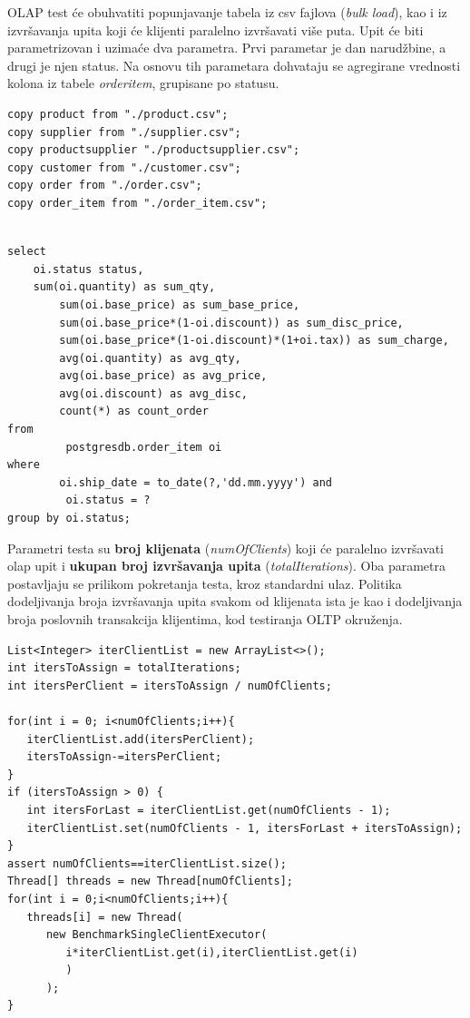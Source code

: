\documentclass[12pt,oneside]{memoir}
\begin{document}
OLAP test će obuhvatiti popunjavanje tabela iz csv fajlova (\textit{bulk load}), kao i iz izvršavanja upita koji će klijenti paralelno izvršavati više puta. Upit će biti parametrizovan i uzimaće dva parametra. Prvi parametar je dan narudžbine, a drugi je njen status. Na osnovu tih parametara dohvataju se agregirane vrednosti kolona iz tabele \textit{orderitem}, grupisane po statusu. 

\begin{lstlisting}[title={bulkLoad - Popunjavanje tabela iz csv fajlova},captionpos=b]
copy product from "./product.csv";
copy supplier from "./supplier.csv";
copy productsupplier "./productsupplier.csv";
copy customer from "./customer.csv";
copy order from "./order.csv";
copy order_item from "./order_item.csv";
\end{lstlisting}

\begin{lstlisting}[title={executeOLAPQuery - OLAP upit},captionpos=b]

select
	oi.status status,
	sum(oi.quantity) as sum_qty,
        sum(oi.base_price) as sum_base_price,
        sum(oi.base_price*(1-oi.discount)) as sum_disc_price,
        sum(oi.base_price*(1-oi.discount)*(1+oi.tax)) as sum_charge,
        avg(oi.quantity) as avg_qty,
        avg(oi.base_price) as avg_price,
        avg(oi.discount) as avg_disc,
        count(*) as count_order
from
         postgresdb.order_item oi
where
        oi.ship_date = to_date(?,'dd.mm.yyyy') and
         oi.status = ?
group by oi.status;
\end{lstlisting}


Parametri testa su \textbf{broj klijenata} (\textit{numOfClients}) koji će paralelno izvršavati olap upit i \textbf{ukupan broj izvršavanja upita} (\textit{totalIterations}). Oba parametra postavljaju se prilikom pokretanja testa, kroz standardni ulaz. Politika dodeljivanja broja izvršavanja upita svakom od klijenata ista je kao i dodeljivanja broja poslovnih transakcija klijentima, kod testiranja OLTP okruženja.

\begin{lstlisting}[title={Implementacija politike podele posla klijentima},captionpos=b]
List<Integer> iterClientList = new ArrayList<>();
int itersToAssign = totalIterations;
int itersPerClient = itersToAssign / numOfClients;

for(int i = 0; i<numOfClients;i++){	
   iterClientList.add(itersPerClient);
   itersToAssign-=itersPerClient;
}
if (itersToAssign > 0) {
   int itersForLast = iterClientList.get(numOfClients - 1);
   iterClientList.set(numOfClients - 1, itersForLast + itersToAssign);
}
assert numOfClients==iterClientList.size();
Thread[] threads = new Thread[numOfClients];
for(int i = 0;i<numOfClients;i++){
   threads[i] = new Thread(
      new BenchmarkSingleClientExecutor(
         i*iterClientList.get(i),iterClientList.get(i)
         )
      );
}
\end{lstlisting}
\end{document}
